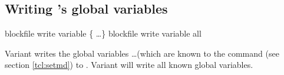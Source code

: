 







\subsection{Writing \es's global variables}

\begin{essyntax}
   blockfile  
  write variable \{  \dots \}
   blockfile  write variable all
\end{essyntax}

Variant  writes the global variables 
 \dots (which are known to the  command (see
section \vref{tcl:setmd}) to . Variant  will
write all known global variables.

